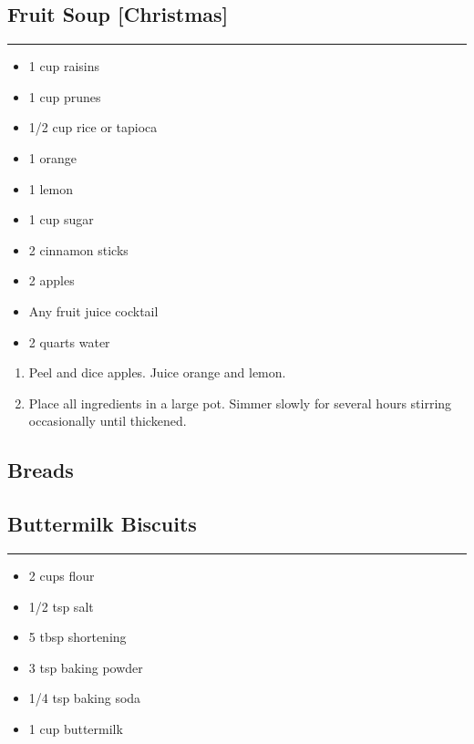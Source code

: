 \documentclass{article}
\begin{document}
\subsection{Fruit Soup [Christmas]} 
\noindent\rule[0.5ex]{\linewidth}{1pt}

\begin{framed}
    \begin{itemize}
        \item 1 cup raisins 
        \item 1 cup prunes 
        \item 1/2 cup rice or tapioca 
        \item 1 orange 
        \item 1 lemon 
        \item 1 cup sugar 
        \item 2 cinnamon sticks 
        \item 2 apples
        \item Any fruit juice cocktail 
        \item 2 quarts water 
    \end{itemize}
\end{framed}

\begin{enumerate}
    \item 
        Peel and dice apples. Juice orange and lemon.
    \item 
        Place all ingredients in a large pot. Simmer slowly for several hours stirring occasionally until thickened.
\end{enumerate}
\newpage

\vspace*{\fill}
\begin{center}
    \section{Breads}
\end{center}
\vspace*{\fill}
\newpage

\subsection{Buttermilk Biscuits} 
\noindent\rule[0.5ex]{\linewidth}{1pt}

\begin{framed}
    \begin{itemize}
        \item 2 cups flour
        \item 1/2 tsp salt
        \item 5 tbsp shortening
        \item 3 tsp baking powder
        \item 1/4 tsp baking soda
        \item 1 cup buttermilk
    \end{itemize}
\end{framed}
\end{document}
